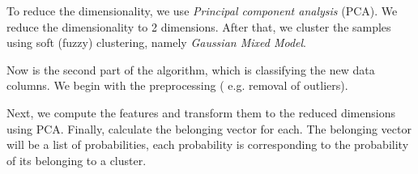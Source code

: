 \documentclass{article}
\newcommand{\comm}[2][inline]{\color{green} #2 \color{black}}
\begin{document}
To reduce the dimensionality, we use \textit{Principal component analysis} (PCA). We reduce the dimensionality to 2 dimensions. After that, we cluster the samples using soft (fuzzy) clustering, namely \textit{Gaussian Mixed Model}.

Now is the second part of the algorithm, which is classifying the new data columns. We begin with the preprocessing ( e.g. removal of outliers). 


 Next, we compute the features and transform them to the reduced dimensions using PCA. Finally, calculate the belonging vector for each. The belonging vector will be a list of probabilities, each probability is corresponding to the probability of its belonging to a cluster. 
 
 
  




\end{document}
